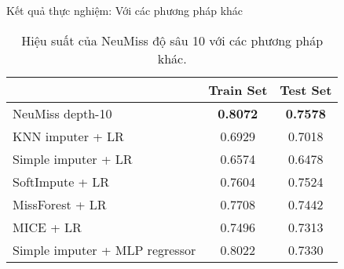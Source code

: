 \begin{frame}{Kết quả thực nghiệm: Với các phương pháp khác}
    
\begin{table}[h!]
\centering
\setlength{\tabcolsep}{10pt}
\begin{tabular}{lcc}
\toprule
& \multicolumn{1}{c}{\textbf{Train Set}} 
& \multicolumn{1}{c}{\textbf{Test Set}} \\
\midrule
NeuMiss depth-10 & \textbf{0.8072}  & \textbf{0.7578} \\
KNN imputer + LR & 0.6929 & 0.7018 \\
Simple imputer + LR & 0.6574 & 0.6478 \\
SoftImpute + LR & 0.7604 & 0.7524 \\
MissForest + LR & 0.7708 & 0.7442 \\
MICE + LR & 0.7496 & 0.7313 \\
Simple imputer + MLP regressor & 0.8022 & 0.7330 \\

\bottomrule
\end{tabular}
\caption{Hiệu suất của NeuMiss độ sâu 10 với các phương pháp khác.}
\label{tab:performance-others}
\end{table}

\end{frame}
